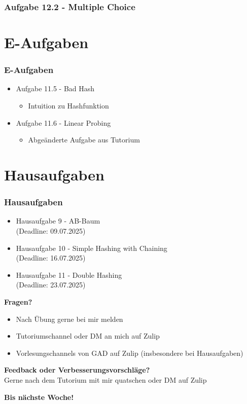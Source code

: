 \documentclass{beamer}
\begin{document}
\begin{frame}
	\frametitle{Aufgabe 12.2 - Multiple Choice}

\end{frame}

\section{E-Aufgaben}
\begin{frame}
	\frametitle{E-Aufgaben}
	\begin{itemize}
		\item Aufgabe 11.5 - Bad Hash \\
		      \begin{itemize}
			      \item Intuition zu Hashfunktion
		      \end{itemize}
		\item Aufgabe 11.6 - Linear Probing \\
		      \begin{itemize}
			      \item Abgeänderte Aufgabe aus Tutorium
		      \end{itemize}
	\end{itemize}
\end{frame}

\section{Hausaufgaben}
\begin{frame}
	\frametitle{Hausaufgaben}
	\begin{itemize}
		\item Hausaufgabe 9 - AB-Baum \\
		      (Deadline: 09.07.2025)
		\item Hausaufgabe 10 - Simple Hashing with Chaining \\
		      (Deadline: 16.07.2025)
		\item Hausaufgabe 11 - Double Hashing \\
		      (Deadline: 23.07.2025)
	\end{itemize}
\end{frame}

\begin{frame}
	\textbf{Fragen?}
	\begin{itemize}
		\item Nach Übung gerne bei mir melden
		\item Tutoriumschannel oder DM an mich auf Zulip
		\item Vorlesungschannels von GAD auf Zulip (insbesondere bei Hausaufgaben)
	\end{itemize}

	\medskip
	\textbf{Feedback oder Verbesserungsvorschläge?} \\
	Gerne nach dem Tutorium mit mir quatschen oder DM auf Zulip

	\medskip
	\textbf{Bis nächste Woche!}
\end{frame}

\end{document}
